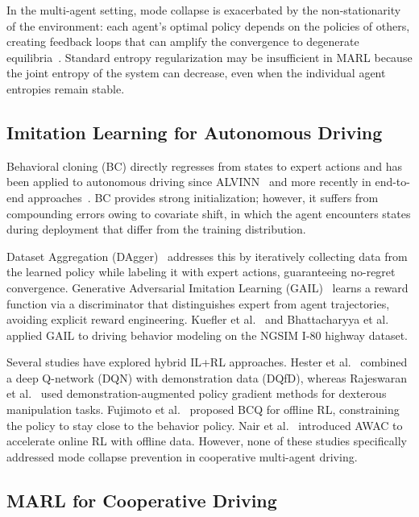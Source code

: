 \documentclass[journal]{IEEEtran}
\begin{document}
In the multi-agent setting, mode collapse is exacerbated by the non-stationarity of the environment: each agent's optimal policy depends on the policies of others, creating feedback loops that can amplify the convergence to degenerate equilibria~\cite{zhang2021multi}.
Standard entropy regularization may be insufficient in MARL because the joint entropy of the system can decrease, even when the individual agent entropies remain stable.

\subsection{Imitation Learning for Autonomous Driving}

Behavioral cloning (BC) directly regresses from states to expert actions and has been applied to autonomous driving since ALVINN~\cite{pomerleau1991efficient} and more recently in end-to-end approaches~\cite{bojarski2016end,codevilla2018end}.
BC provides strong initialization; however, it suffers from compounding errors owing to covariate shift, in which the agent encounters states during deployment that differ from the training distribution.

Dataset Aggregation (DAgger)~\cite{ross2011reduction} addresses this by iteratively collecting data from the learned policy while labeling it with expert actions, guaranteeing no-regret convergence.
Generative Adversarial Imitation Learning (GAIL)~\cite{ho2016generative} learns a reward function via a discriminator that distinguishes expert from agent trajectories, avoiding explicit reward engineering.
Kuefler et al.~\cite{kuefler2017imitating} and Bhattacharyya et al.~\cite{bhattacharyya2022modeling} applied GAIL to driving behavior modeling on the NGSIM I-80 highway dataset.

Several studies have explored hybrid IL+RL approaches. Hester et al.~\cite{hester2018deep} combined a deep Q-network (DQN) with demonstration data (DQfD), whereas Rajeswaran et al.~\cite{rajeswaran2018learning} used demonstration-augmented policy gradient methods for dexterous manipulation tasks.
Fujimoto et al.~\cite{fujimoto2019off} proposed BCQ for offline RL, constraining the policy to stay close to the behavior policy.
Nair et al.~\cite{nair2020awac} introduced AWAC to accelerate online RL with offline data.
However, none of these studies specifically addressed mode collapse prevention in cooperative multi-agent driving.

\subsection{MARL for Cooperative Driving}
\end{document}
